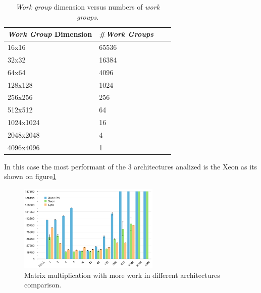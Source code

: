 \begin{table}[!h]
    \centering
    \begin{tabular}{| l | l | l | l |}
    \hline
    \emph{Work Group} Dimension & \#\emph{Work Groups} \\ \hline
    16x16 & 65536 \\ \hline
    32x32 & 16384 \\ \hline
    64x64 & 4096 \\ \hline
    128x128 & 1024 \\ \hline
    256x256 & 256 \\ \hline
    512x512 & 64 \\ \hline
    1024x1024 & 16 \\ \hline
    2048x2048 & 4 \\ \hline
    4096x4096 & 1 \\ 
    \hline
    \end{tabular}
    \caption{\emph{Work group} dimension versus numbers of \emph{work groups}.}
    \label{tab:work_groups}
\end{table}

\par{In this case the most performant of the 3 architectures analized is the Xeon as its shown on figure\ref{MoreWorkComp}}

\begin{figure}[!h]
    \centering
    \includegraphics[width=0.6\textwidth]{figures/opt1_comp.png}
    \caption{Matrix multiplication with more work in different architectures comparison.}
    \label{MoreWorkComp}
\end{figure}

